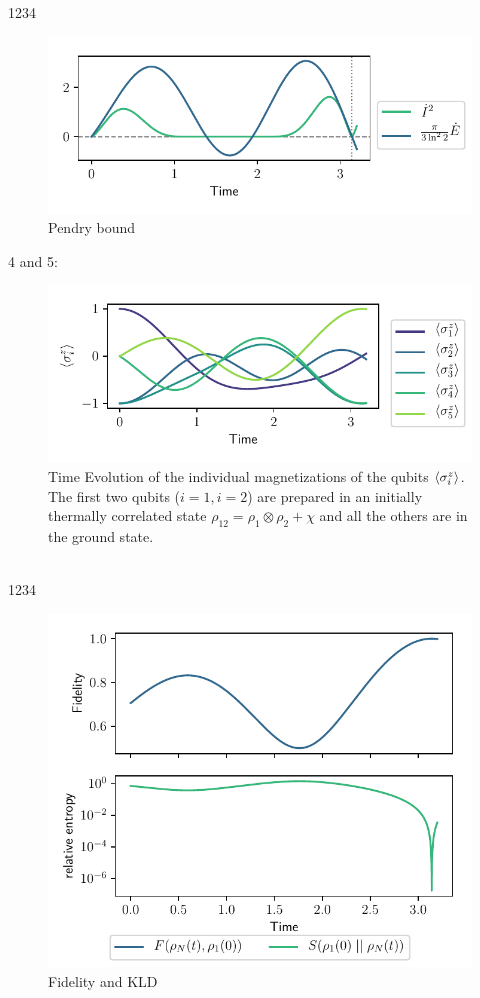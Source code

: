 \documentclass{book}
\numberwithin{equation}{section} %
\begin{document}
1234
\begin{figure}[h!]
    \centering
    \includegraphics{alltheplots/corr_at_diff_pos-new-alpha/34_pendry_grey_lines.pdf}
    \caption{Pendry bound \cite{BA_Pendry_1983}}
    \label{fig:corr34_pendry}
\end{figure}
4 and 5:
\begin{figure}[h!]
    \centering
    \includegraphics{alltheplots/corr_at_diff_pos-new-alpha/45_expval_z.pdf}
    \caption{Time Evolution of the individual magnetizations of the qubits
    $\expval{\sigma^z_i}$.
    The first two qubits ($i=1, i=2$) are prepared in an initially thermally correlated state $\rho_{12} = \rho_1 \otimes \rho_2 + \chi$
    and all the others are in the ground state.}
    \label{fig:corr45_expval_z}
\end{figure}\\
1234
\begin{figure}[h!]
    \centering
    \includegraphics{alltheplots/corr_at_diff_pos-new-alpha/45_fidelity_kld.pdf}
    \caption{Fidelity and KLD}
    \label{fig:corr45_fid_kld}
\end{figure}\\
\end{document}
